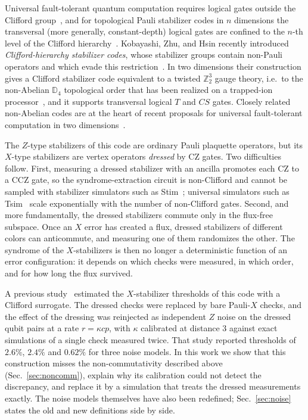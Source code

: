 \documentclass[a4paper]{article}
\begin{document}
Universal fault-tolerant quantum computation requires logical gates outside the Clifford group~\cite{eastin-knill2009}, and for topological Pauli stabilizer codes in $n$ dimensions the transversal (more generally, constant-depth) logical gates are confined to the $n$-th level of the Clifford hierarchy~\cite{bravyikonig2013}. Kobayashi, Zhu, and Hsin recently introduced \emph{Clifford-hierarchy stabilizer codes}, whose stabilizer groups contain non-Pauli operators and which evade this restriction~\cite{kobayashi2025clifford}. In two dimensions their construction gives a Clifford stabilizer code equivalent to a twisted $\mathbb{Z}_2^3$ gauge theory, i.e.\ to the non-Abelian $\mathbb{D}_4$ topological order that has been realized on a trapped-ion processor~\cite{iqbal2024nonabelian}, and it supports transversal logical $T$ and $CS$ gates. Closely related non-Abelian codes are at the heart of recent proposals for universal fault-tolerant computation in two dimensions~\cite{davydova2025knots,magdalena2026}.

The $Z$-type stabilizers of this code are ordinary Pauli plaquette operators, but its $X$-type stabilizers are vertex operators \emph{dressed} by CZ gates. Two difficulties follow. First, measuring a dressed stabilizer with an ancilla promotes each CZ to a CCZ gate, so the syndrome-extraction circuit is non-Clifford and cannot be sampled with stabilizer simulators such as Stim~\cite{gidney2021stim,gottesmanknill1998}; universal simulators such as Tsim~\cite{haenel2026tsim} scale exponentially with the number of non-Clifford gates. Second, and more fundamentally, the dressed stabilizers commute only in the flux-free subspace. Once an $X$ error has created a flux, dressed stabilizers of different colors can anticommute, and measuring one of them randomizes the other. The syndrome of the $X$-stabilizers is then no longer a deterministic function of an error configuration: it depends on which checks were measured, in which order, and for how long the flux survived.

A previous study~\cite{haga2026aqis} estimated the $X$-stabilizer thresholds of this code with a Clifford surrogate. The dressed checks were replaced by bare Pauli-$X$ checks, and the effect of the dressing was reinjected as independent $Z$ noise on the dressed qubit pairs at a rate $r=\kappa c p$, with $\kappa$ calibrated at distance $3$ against exact simulations of a single check measured twice. That study reported thresholds of $2.6\%$, $2.4\%$ and $0.62\%$ for three noise models. In this work we show that this construction misses the non-commutativity described above (Sec.~\ref{sec:noncomm}), explain why its calibration could not detect the discrepancy, and replace it by a simulation that treats the dressed measurements exactly. The noise models themselves have also been redefined; Sec.~\ref{sec:noise} states the old and new definitions side by side.
\end{document}
